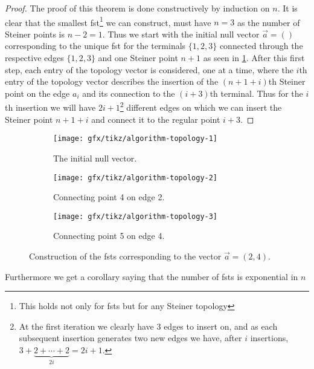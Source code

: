 \begin{proof}
The proof of this theorem is done constructively by induction on $n$. It is
clear that the smallest \ac{fst}\footnote{This holds not only for \acp{fst}
  but for any Steiner topology} we can construct, must have $n = 3$ as the
number of Steiner points is $n - 2 = 1$. Thus we start with the initial null
vector $\vec{a} = ()$ corresponding to the unique \ac{fst} for the terminals
$\{1, 2, 3\}$ connected through the respective edges $\{1, 2, 3\}$ and one
Steiner point $n+1$ as seen in \cref{fig:algorithm-topology-1}. After this
first step, each entry of the topology vector is considered, one at a time,
where the $i$th entry of the topology vector describes the insertion of the
$(n+1+i)$th Steiner point on the edge $a_{i}$ and its connection to the
$(i+3)$th terminal. Thus for the $i$th insertion we will have
$2i+1$\footnote{At the first iteration we clearly have $3$ edges to insert on, and
  as each subsequent insertion generates two new edges we have, after $i$
  insertions, $3 + \underbrace{2 + \cdots + 2}_{2 i} = 2 i + 1$.} different
edges on which we can insert the Steiner point $n + 1 + i$ and connect it to the
regular point $i+3$.
\end{proof}

\begin{figure}[htbp] \centering
  \begin{subfigure}[t]{0.267\textwidth}
    \texttt{[image: gfx/tikz/algorithm-topology-1]}
    \caption{The initial null vector.\label{fig:algorithm-topology-1}}
  \end{subfigure}\hspace{1em}%
  \begin{subfigure}[t]{0.267\textwidth}
    \texttt{[image: gfx/tikz/algorithm-topology-2]}
    \caption{Connecting point 4 on edge 2.\label{fig:algorithm-topology-2}}
  \end{subfigure}\hspace{1em}%
  \begin{subfigure}[t]{0.267\textwidth}
    \texttt{[image: gfx/tikz/algorithm-topology-3]}
    \caption{Connecting point 5 on edge 4.\label{fig:algorithm-topology-3}}
  \end{subfigure}
  \caption[Construction of FSTs]{Construction of the \acp{fst} corresponding
to the vector $\vec{a} = (2, 4)$.\label{fig:algorithm-topologies}}
\end{figure}

Furthermore we get a corollary saying that the number of \acp{fst} is
exponential in $n$

